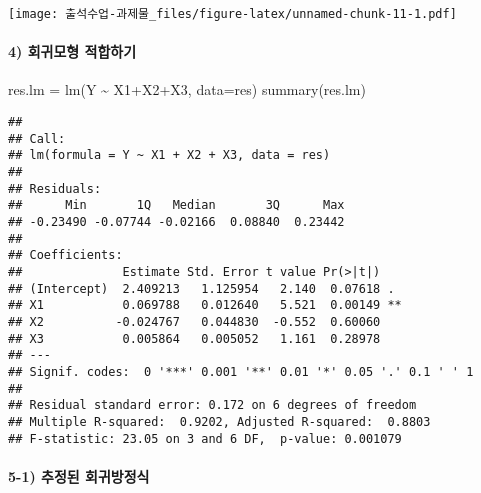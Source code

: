 \documentclass[
]{article}
\newenvironment{Shaded}{\begin{snugshade}}{\end{snugshade}}
\newcommand{\AttributeTok}[1]{\textcolor[rgb]{0.77,0.63,0.00}{#1}}
\newcommand{\FunctionTok}[1]{\textcolor[rgb]{0.00,0.00,0.00}{#1}}
\newcommand{\NormalTok}[1]{#1}
\newcommand{\OtherTok}[1]{\textcolor[rgb]{0.56,0.35,0.01}{#1}}
\newcommand{\SpecialCharTok}[1]{\textcolor[rgb]{0.00,0.00,0.00}{#1}}
\begin{document}
\texttt{[image: 출석수업-과제물\_files/figure-latex/unnamed-chunk-11-1.pdf]}

\hypertarget{uxd68cuxadc0uxbaa8uxd615-uxc801uxd569uxd558uxae30}{%
\paragraph{4) 회귀모형
적합하기}\label{uxd68cuxadc0uxbaa8uxd615-uxc801uxd569uxd558uxae30}}

\begin{Shaded}
\begin{Highlighting}[]
\NormalTok{res.lm }\OtherTok{=} \FunctionTok{lm}\NormalTok{(Y }\SpecialCharTok{\textasciitilde{}}\NormalTok{ X1}\SpecialCharTok{+}\NormalTok{X2}\SpecialCharTok{+}\NormalTok{X3, }\AttributeTok{data=}\NormalTok{res) }
\FunctionTok{summary}\NormalTok{(res.lm)}
\end{Highlighting}
\end{Shaded}

\begin{verbatim}
## 
## Call:
## lm(formula = Y ~ X1 + X2 + X3, data = res)
## 
## Residuals:
##      Min       1Q   Median       3Q      Max 
## -0.23490 -0.07744 -0.02166  0.08840  0.23442 
## 
## Coefficients:
##              Estimate Std. Error t value Pr(>|t|)   
## (Intercept)  2.409213   1.125954   2.140  0.07618 . 
## X1           0.069788   0.012640   5.521  0.00149 **
## X2          -0.024767   0.044830  -0.552  0.60060   
## X3           0.005864   0.005052   1.161  0.28978   
## ---
## Signif. codes:  0 '***' 0.001 '**' 0.01 '*' 0.05 '.' 0.1 ' ' 1
## 
## Residual standard error: 0.172 on 6 degrees of freedom
## Multiple R-squared:  0.9202, Adjusted R-squared:  0.8803 
## F-statistic: 23.05 on 3 and 6 DF,  p-value: 0.001079
\end{verbatim}

\hypertarget{uxcd94uxc815uxb41c-uxd68cuxadc0uxbc29uxc815uxc2dd}{%
\paragraph{5-1) 추정된
회귀방정식}\label{uxcd94uxc815uxb41c-uxd68cuxadc0uxbc29uxc815uxc2dd}}
\end{document}
